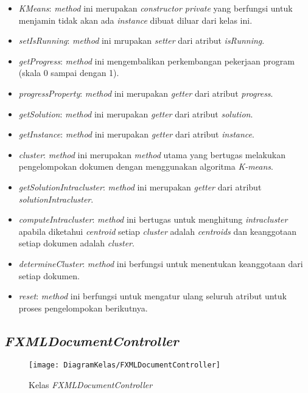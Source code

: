 \begin{itemize}
	\item \textit{KMeans}: \textit{method} ini merupakan \textit{constructor private} yang berfungsi untuk menjamin tidak akan ada \textit{instance} dibuat diluar dari kelas ini.
	\item \textit{setIsRunning}: \textit{method} ini mrupakan \textit{setter} dari atribut \textit{isRunning}.
	\item \textit{getProgress}: \textit{method} ini mengembalikan perkembangan pekerjaan program (skala 0 sampai dengan 1).
	\item \textit{progressProperty}: \textit{method} ini merupakan \textit{getter} dari atribut \textit{progress}.
	\item \textit{getSolution}: \textit{method} ini merupakan \textit{getter} dari atribut \textit{solution}.
	\item \textit{getInstance}: \textit{method} ini merupakan \textit{getter} dari atribut \textit{instance}.
	\item \textit{cluster}: \textit{method} ini merupakan \textit{method} utama yang bertugas melakukan pengelompokan dokumen dengan menggunakan algoritma \textit{K-means}.
	\item \textit{getSolutionIntracluster}: \textit{method} ini merupakan \textit{getter} dari atribut \textit{solutionIntracluster}.
	\item \textit{computeIntracluster}: \textit{method} ini bertugas untuk menghitung \textit{intracluster} apabila diketahui \textit{centroid} setiap \textit{cluster} adalah \textit{centroids} dan keanggotaan setiap dokumen adalah \textit{cluster}.
	\item \textit{determineCluster}: \textit{method} ini berfungsi untuk menentukan keanggotaan dari setiap dokumen.
	\item \textit{reset}: \textit{method} ini berfungsi untuk mengatur ulang seluruh atribut untuk proses pengelompokan berikutnya.
\end{itemize}

\subsection{\textit{FXMLDocumentController}}

\begin{figure}[H]
	\begin{center}
		\texttt{[image: DiagramKelas/FXMLDocumentController]}
		\caption{Kelas \textit{FXMLDocumentController}}
		\label{fig:kelasFXMLDocumentController}
	\end{center}
\end{figure}


